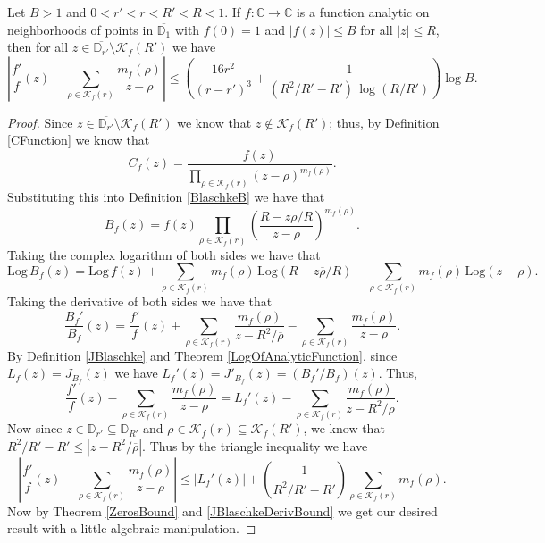 \begin{theorem}[FinalBound]
\label{FinalBound}
\leanok
Let $B>1$ and $0 < r' < r < R' < R<1$. If $f:\mathbb{C}\to\mathbb{C}$ is a function
    analytic on neighborhoods of points in $\overline{\mathbb{D}_1}$ with $f(0)=1$ and
    $|f(z)|\leq B$ for all $|z|\leq R$, then for all
    $z\in\overline{\mathbb{D}_{r'}}\setminus\mathcal{K}_f(R')$ we have
    $$\left|\frac{f'}{f}(z)-\sum_{\rho\in\mathcal{K}_f(r)}\frac{m_f(\rho)}{z-\rho}\right|
      \leq\left(\frac{16r^2}{(r-r')^3}+\frac{1}{(R^2/R'-R')\,\log(R/R')}\right)\log B.$$
\end{theorem}
\begin{proof}
\leanok
Since $z\in\overline{\mathbb{D}_{r'}}\setminus\mathcal{K}_f(R')$ we know that
    $z\not\in\mathcal{K}_f(R')$; thus, by Definition \ref{CFunction} we know that
    $$C_f(z)=\frac{f(z)}{\displaystyle\prod_{\rho\in\mathcal{K}_f(r)}(z-\rho)^{m_f(\rho)}}.$$
    Substituting this into Definition \ref{BlaschkeB} we have that
    $$B_f(z)=f(z)\prod_{\rho\in\mathcal{K}_f(r)}
      \left(\frac{R-z\overline{\rho}/R}{z-\rho}\right)^{m_f(\rho)}.$$
    Taking the complex logarithm of both sides we have that
    $$\mathrm{Log}\,B_f(z)=\mathrm{Log}\,f(z)
      +\sum_{\rho\in\mathcal{K}_f(r)}m_f(\rho)\,\mathrm{Log}(R-z\overline{\rho}/R)
      -\sum_{\rho\in\mathcal{K}_f(r)}m_f(\rho)\,\mathrm{Log}(z-\rho).$$
    Taking the derivative of both sides we have that
    $$\frac{B_f'}{B_f}(z)=\frac{f'}{f}(z)
      +\sum_{\rho\in\mathcal{K}_f(r)}\frac{m_f(\rho)}{z-R^2/\overline{\rho}}
      -\sum_{\rho\in\mathcal{K}_f(r)}\frac{m_f(\rho)}{z-\rho}.$$
    By Definition \ref{JBlaschke} and Theorem \ref{LogOfAnalyticFunction},
    since $L_f(z)=J_{B_f}(z)$ we have $L_f'(z)=J'_{B_f}(z)=(B_f'/B_f)(z)$. Thus,
    $$\frac{f'}{f}(z)-\sum_{\rho\in\mathcal{K}_f(r)}\frac{m_f(\rho)}{z-\rho}
      =L_f'(z)-\sum_{\rho\in\mathcal{K}_f(r)}\frac{m_f(\rho)}{z-R^2/\overline{\rho}}.$$
    Now since $z\in\overline{\mathbb{D}_{r'}}\subseteq\overline{\mathbb{D}_{R'}}$ and
    $\rho\in\mathcal{K}_f(r)\subseteq\mathcal{K}_f(R')$, we know that
    $R^2/R'-R'\leq|z-R^2/\overline{\rho}|$. Thus by the triangle inequality we have
    $$\left|\frac{f'}{f}(z)-\sum_{\rho\in\mathcal{K}_f(r)}\frac{m_f(\rho)}{z-\rho}\right|
      \leq|L_f'(z)|+\left(\frac{1}{R^2/R'-R'}\right)\sum_{\rho\in\mathcal{K}_f(r)}m_f(\rho).$$
    Now by Theorem \ref{ZerosBound} and \ref{JBlaschkeDerivBound} we get our desired result
    with a little algebraic manipulation.
\end{proof}
